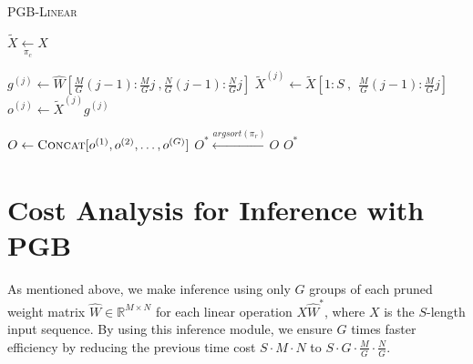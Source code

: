 \begin{algorithm}[h]
\SetNoFillComment
\DontPrintSemicolon
	{
		\caption{\small \textsc{PGB-Linear}}\label{alg:infer}

		{
            $\widetilde{X} \xleftarrow[\pi_c]{} X$\;
            
            {
                
                $g^{(j)} \leftarrow \widehat{W}[\frac{M}{G}(j-1):\frac{M}{G}j~,\frac{N}{G}(j-1):\frac{N}{G}j]$\;
                $\widetilde{X}^{(j)} \leftarrow \widetilde{X}[1:S~,~~\frac{M}{G}(j-1):\frac{M}{G}j]$\;
                $o^{(j)} \leftarrow \widetilde{X}^{(j)}g^{(j)}$\;
            }

            $O \leftarrow \textsc{Concat}[o^{(1)},o^{(2)},\dots,o^{(G)}]$\;
            $O^{*} \xleftarrow[]{argsort(\pi_r)} O$\;
            \Return ${O^{*}}$\;
		}
        
    }
\end{algorithm}

\section{Cost Analysis for Inference with PGB} \label{sec:cost}
As mentioned above, we make inference using only $G$ groups of each pruned weight matrix $\widehat{W} \in \mathbb{R}^{M\times N}$ for each linear operation $X \widehat{W}^*$, where $X$ is the $S$-length input sequence. By using this inference module, we ensure $G$ times faster efficiency by reducing the previous time cost $S  \cdot  M \cdot N$ to $S \cdot G  \cdot \frac{M}{G} \cdot \frac{N}{G}$. 

